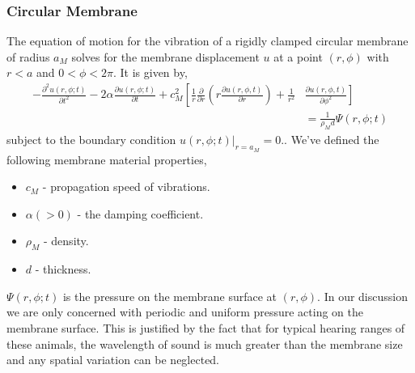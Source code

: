 \subsubsection{Circular Membrane}
The equation of motion for the vibration of a rigidly clamped circular membrane of radius $a_M$ solves for the membrane displacement $u$ at
a point $(r,\phi)$ with $r<a$ and $0<\phi<2\pi$. It is given by,
\begin{equation}\label{membraneequation1}
 \begin{split}
 -\frac{\partial^2 u(r,\phi;t)}{\partial t^2}-2\alpha\frac{\partial u(r,\phi;t)}{\partial t}+c^2_M \left[\frac{1}{r}\frac{\partial}{\partial r}\left(r\frac{\partial u(r,\phi,t)}{\partial r}\right)\right. +\frac{1}{r^2}&\left.\frac{\partial u(r,\phi,t)}{\partial \phi^2}\right]
 \\ &=\frac{1}{\rho_M d}\Psi(r,\phi;t)
 \end{split}
\end{equation}
subject to the boundary condition $u(r,\phi;t)|_{r=a_M}=0$.. We've defined the following membrane material properties,
\begin{itemize}
 \item $c_M$ - propagation speed of vibrations.
 \item $\alpha (>0)$ - the damping coefficient.
 \item $\rho_M$ - density.
 \item $d$ - thickness.
\end{itemize}
$\Psi(r,\phi;t)$ is the pressure on the membrane surface at $(r,\phi)$. In our discussion we are only concerned with periodic and uniform 
pressure acting on the membrane surface. This is justified by the fact that for typical hearing ranges of these animals, the wavelength
of sound is much greater than the membrane size and any spatial variation can be neglected.
